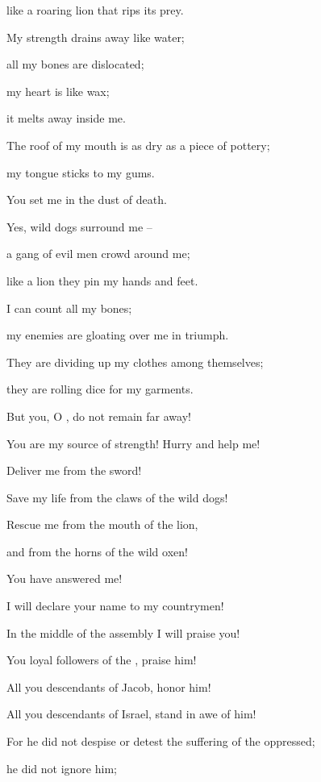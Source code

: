 {\par }{\Q like a roaring
lion
that rips its prey.
\par }{\Q {}My strength drains
away like water;
\par }{\Q all
my bones
are dislocated;
\par }{\Q my heart
is like wax;
\par }{\Q it melts away
inside me.
\par }{\Q {}The roof of my mouth is as dry
as a piece of pottery;
\par }{\Q my tongue
sticks
to my gums.
\par }{\Q You set
me in the dust
of death.
\par }{\Q {}Yes,
wild dogs
surround me –
\par }{\Q a gang of evil men crowd around me;
\par }{\Q like a lion they pin my hands and feet.
\par }{\Q {}I can count
all
my bones;
\par }{\Q my enemies are
gloating
over me in triumph.
\par }{\Q {}They are dividing
up my clothes
among themselves;
\par }{\Q they are rolling
dice
for
my garments.
\par }{\Q {}But you,
O
{}, do not
remain far away!
\par }{\Q You are my source of strength! Hurry
and help me!
\par }{\Q {}Deliver
me from the sword!
\par }{\Q Save my life
from the claws
of the wild dogs!
\par }{\Q {}Rescue
me from the mouth
of the lion,
\par }{\Q and from the horns
of the wild oxen!

\par }{\Q You have answered me!
\par }{\Q {}I will declare
your name
to my countrymen!

\par }{\Q In the middle
of the assembly
I will praise you!
\par }{\Q {}You loyal followers
of the {}, praise
him!
\par }{\Q All
you descendants
of Jacob,
honor
him!
\par }{\Q All
you descendants
of Israel,
stand in awe of him!
\par }{\Q {}For
he did not
despise
or
detest
the suffering
of the oppressed;
\par }{\Q he did not
ignore
him;

}
